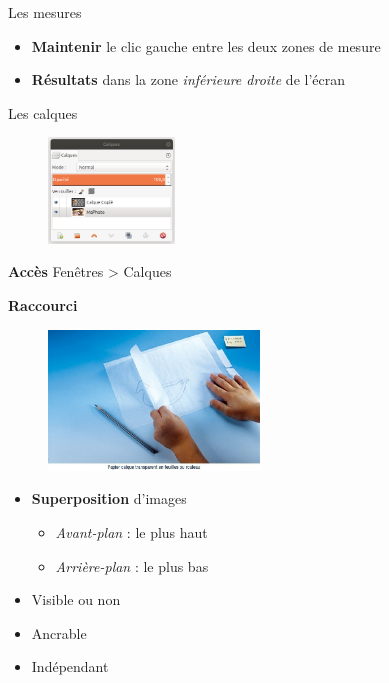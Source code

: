 \documentclass[10pt,svgnames,usenames,table]{beamer}
\begin{document}
\begin{frame}[allowframebreaks]{Les mesures}
\begin{itemize}
	\begin{itemize}
		\item \textbf{Maintenir} le clic gauche entre les deux zones de mesure
		\item \textbf{Résultats} dans la zone \textit{inférieure droite} de l'écran
	\end{itemize}
\end{itemize}
\end{frame}

\begin{frame}[allowframebreaks]{Les calques}
	\begin{figure}
        	\centering
        	\includegraphics[width=0.3\textwidth]{Images/gimp_calques}
    	\end{figure}
    	
	\textbf{Accès} Fenêtres > Calques
	
	\vspace{0.2cm}
	\textbf{Raccourci} 
	
	\framebreak
	
	\begin{figure}
        	\centering
        	\includegraphics[width=0.5\textwidth]{Images/Calque.jpg}
    	\end{figure}
	
	\begin{itemize}
		\item \textbf{Superposition} d'images
		\begin{itemize}
			\item \textit{Avant-plan} : le plus haut
			\item \textit{Arrière-plan} : le plus bas
		\end{itemize}
		\item Visible ou non 
		\item Ancrable
		\item Indépendant
	\end{itemize}	
	

\end{frame}
\end{document}

